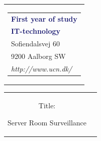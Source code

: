


% 
\thispagestyle{empty}
\begin{nopagebreak}
{\samepage 

\begin{tabular}{r}
\parbox{\textwidth}{  
\hfill \hspace{2cm} \parbox{8cm}{\begin{tabular}{l} %
{\small \textbf{\textcolor{MidnightBlue}{First year of study}}}\\
{\small \textbf{\textcolor{MidnightBlue}{IT-technology}}}\\ 
{\small \textcolor{NavyBlue}{Sofiendalsvej 60}} \\
{\small \textcolor{NavyBlue}{9200 Aalborg SW}} \\
{\small \textcolor{NavyBlue}{\emph{http://www.ucn.dk/}}}
\end{tabular}}}
\end{tabular}

\begin{tabular}{cc}
\parbox{7cm}{
\begin{description}

\item { Title:} 

Server Room Surveillance

\end{description}

\parbox{8cm}{

}}
\end{tabular}}
\end{nopagebreak}
